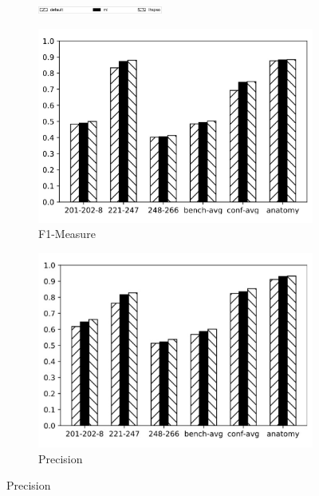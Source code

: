 \documentclass[twoside]{article}
\begin{document}
\begin{figure}[htb!]\centering
\begin{subfigure}{\textwidth}
	\centering
\includegraphics[width=0.45\textwidth]{figures/t_legend.pdf}
\end{subfigure}
\begin{subfigure}{0.3\textwidth}
	\centering
\includegraphics[width=\textwidth]{data_figs/MulRegress_LogMap_F1.pdf}
\caption{F1-Measure}
\label{fig:MultiRegress_LogMap_F1}
\end{subfigure}
\begin{subfigure}{0.3\textwidth}
	\centering
\includegraphics[width=\textwidth]{data_figs/MulRegress_LogMap_P.pdf}
\caption{Precision}

\end{subfigure}
\end{figure}
\end{document}
